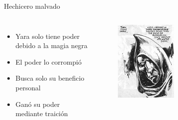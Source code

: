 \begin{frame}{Hechicero malvado}
\begin{columns}
 \begin{itemize}
    \item Yara solo tiene poder debido a la magia negra
    \item El poder lo corrompió
    \item Busca solo su beneficio personal
    \item Ganó su poder mediante traición
 \end{itemize}
    \begin{figure}[htb]
      \centering
      \includegraphics[width=0.5\textwidth]{img/tropes/malvado}
    \end{figure} 
  \end{columns}
\end{frame}

